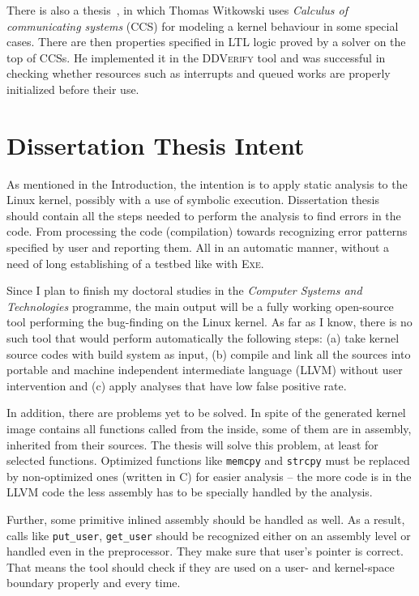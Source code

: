 \documentclass[11pt,a4paper]{article}
\begin{document}
There is also a thesis~\cite{kernel_master_thesis}, in which Thomas Witkowski
uses \emph{Calculus of communicating systems} (CCS) for modeling a kernel
behaviour in some special cases. There are then properties specified in LTL
logic proved by a solver on the top of CCSs. He implemented it in the
\textsc{DDVerify} tool and was successful in checking whether resources such
as interrupts and queued works are properly initialized before their use.

\newpage

\section{Dissertation Thesis Intent}
\label{intent}
As mentioned in the Introduction, the intention is to apply static analysis to
the Linux kernel, possibly with a use of symbolic execution. Dissertation
thesis should contain all the steps needed to perform the analysis to find
errors in the code. From processing the code (compilation) towards recognizing
error patterns specified by user and reporting them. All in an automatic
manner, without a need of long establishing of a testbed like with
\textsc{Exe}.

Since I plan to finish my doctoral studies in the \emph{Computer Systems and
Technologies} programme, the main output will be a fully working open-source
tool performing the bug-finding on the Linux kernel. As far as I know, there
is no such tool that would perform automatically the following steps: (a) take
kernel source codes with build system as input, (b) compile and link all the
sources into portable and machine independent intermediate language (LLVM)
without user intervention and (c) apply analyses that have low false positive
rate.

In addition, there are problems yet to be solved. In spite of the generated
kernel image contains all functions called from the inside, some of them are
in assembly, inherited from their sources. The thesis will solve this problem,
at least for selected functions. Optimized functions like \texttt{memcpy} and
\texttt{strcpy} must be replaced by non-optimized ones (written in C) for
easier analysis -- the more code is in the LLVM code the less assembly has to
be specially handled by the analysis.

Further, some primitive inlined assembly should be handled as well. As a
result, calls like \texttt{put\_user}, \texttt{get\_user} should be recognized
either on an assembly level or handled even in the preprocessor. They make
sure that user's pointer is correct. That means the tool should check if
they are used on a user- and kernel-space boundary properly and every time.
\end{document}
